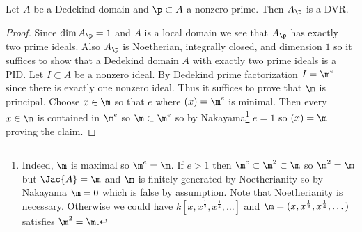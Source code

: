 \documentclass[12pt]{article}
\begin{document}
\begin{prop}
Let $A$ be a Dedekind domain and $\p \subset A$ a nonzero prime. Then $A_\p$ is a DVR.
\end{prop}



\begin{proof}
Since $\dim{A_\p} = 1$ and $A$ is a local domain we see that $A_\p$ has exactly two prime ideals. Also $A_\p$ is Noetherian, integrally closed, and dimension $1$ so it suffices to show that a Dedekind domain $A$ with exactly two prime ideals is a PID. Let $I \subset A$ be a nonzero ideal. By Dedekind prime factorization $I = \m^e$ since there is exactly one nonzero ideal. Thus it suffices to prove that $\m$ is principal. Choose $x \in \m$ so that $e$ where $(x) = \m^e$ is minimal. Then every $x \in \m$ is contained in $\m^e$ so $\m \subset \m^e$ so by Nakayama\footnote{Indeed, $\m$ is maximal so $\m^e = \m$. If $e > 1$ then $\m^e \subset \m^2 \subset \m$ so $\m^2 = \m$ but $\Jac{A} = \m$ and $\m$ is finitely generated by Noetherianity so by Nakayama $\m = 0$ which is false by assumption. Note that Noetherianity is necessary. Otherwise we could have $k[x, x^{\frac{1}{2}}, x^{\frac{1}{4}}, \dots]$ and $\m = (x, x^{\frac{1}{2}}, x^{\frac{1}{4}}, \dots)$ satisfies $\m^2 = \m$.} $e = 1$ so $(x) = \m$ proving the claim.
\end{proof}
\end{document}
